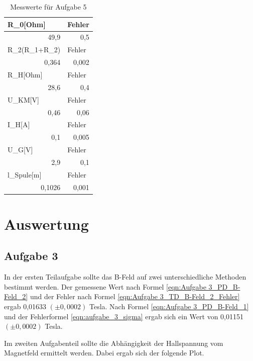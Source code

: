 \documentclass[12pt]{scrartcl}
\begin{document}
\begin{table}[htbp]
\caption{Messwerte für Aufgabe 5}
\begin{center}
\begin{tabular}{|l|l|}
\hline
R\_0[Ohm] & Fehler \\ \hline
\multicolumn{1}{|r|}{49,9} & \multicolumn{1}{r|}{0,5} \\ \hline
R\_2(R\_1+R\_2) & Fehler \\ \hline
\multicolumn{1}{|r|}{0,364} & \multicolumn{1}{r|}{0,002} \\ \hline
R\_H[Ohm] & Fehler \\ \hline
\multicolumn{1}{|r|}{28,6} & \multicolumn{1}{r|}{0,4} \\ \hline
U\_KM[V] & Fehler \\ \hline
\multicolumn{1}{|r|}{0,46} & \multicolumn{1}{r|}{0,06} \\ \hline
I\_H[A] & Fehler \\ \hline
\multicolumn{1}{|r|}{0,1} & \multicolumn{1}{r|}{0,005} \\ \hline
U\_G[V] & Fehler \\ \hline
\multicolumn{1}{|r|}{2,9} & \multicolumn{1}{r|}{0,1} \\ \hline
l\_Spule[m] & Fehler \\ \hline
\multicolumn{1}{|r|}{0,1026} & \multicolumn{1}{r|}{0,001} \\ \hline
\end{tabular}
\end{center}
\label{aufgabe_5}
\end{table}

\section{Auswertung}

\subsection{Aufgabe 3}
In der ersten Teilaufgabe sollte das B-Feld auf zwei unterschiedliche Methoden bestimmt werden.
Der gemessene Wert nach Formel \ref{eqn:Aufgabe 3_PD_B-Feld_2} und der Fehler nach Formel \ref{eqn:Aufgabe 3_TD_B-Feld_2_Fehler} ergab 0,01633 $(\pm 0,0002)$ Tesla. Nach Formel \ref{eqn:Aufgabe 3_PD_B-Feld_1} und der Fehlerformel \ref{eqn:aufgabe_3_sigma} ergab sich ein Wert von 0,01151 $(\pm 0,0002)$ Tesla.

Im zweiten Aufgabenteil sollte die Abhängigkeit der Hallspannung vom Magnetfeld ermittelt werden. Dabei ergab sich der folgende Plot.
\end{document}
